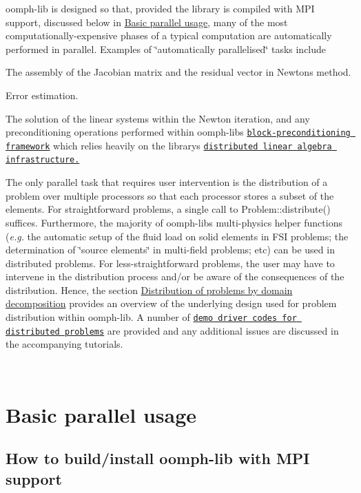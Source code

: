 {\ttfamily oomph-\/lib} is designed so that, provided the library is compiled with M\+PI support, discussed below in \hyperlink{index_basics}{Basic parallel usage}, many of the most computationally-\/expensive phases of a typical computation are automatically performed in parallel. Examples of \char`\"{}automatically parallelised\char`\"{} tasks include
\begin{DoxyItemize}
\item The assembly of the Jacobian matrix and the residual vector in Newton\textquotesingle{}s method.
\item Error estimation.
\item The solution of the linear systems within the Newton iteration, and any preconditioning operations performed within {\ttfamily oomph-\/lib\textquotesingle{}s} \href{../../../mpi/block_preconditioners/html/index.html}{\tt block-\/preconditioning framework} which relies heavily on the library\textquotesingle{}s \href{../../../mpi/distributed_linear_algebra_infrastructure/html/index.html}{\tt distributed linear algebra infrastructure.}
\end{DoxyItemize}The only parallel task that requires user intervention is the distribution of a problem over multiple processors so that each processor stores a subset of the elements. For straightforward problems, a single call to {\ttfamily Problem\+::distribute()} suffices. Furthermore, the majority of {\ttfamily oomph-\/lib\textquotesingle{}s} multi-\/physics helper functions ({\itshape  e.\+g.} the automatic setup of the fluid load on solid elements in F\+SI problems; the determination of \char`\"{}source elements\char`\"{} in multi-\/field problems; etc) can be used in distributed problems. For less-\/straightforward problems, the user may have to intervene in the distribution process and/or be aware of the consequences of the distribution. Hence, the section \hyperlink{index_domain_decomposition}{Distribution of problems by domain decomposition} provides an overview of the underlying design used for problem distribution within {\ttfamily oomph-\/lib}. A number of \href{../../../example_code_list/html/index.html#parallel}{\tt demo driver codes for distributed problems} are provided and any additional issues are discussed in the accompanying tutorials.

~\newline
~\newline


 

\hypertarget{index_basics}{}\section{Basic parallel usage}\label{index_basics}
\hypertarget{index_installation}{}\subsection{How to build/install oomph-\/lib with M\+P\+I support}\label{index_installation}

